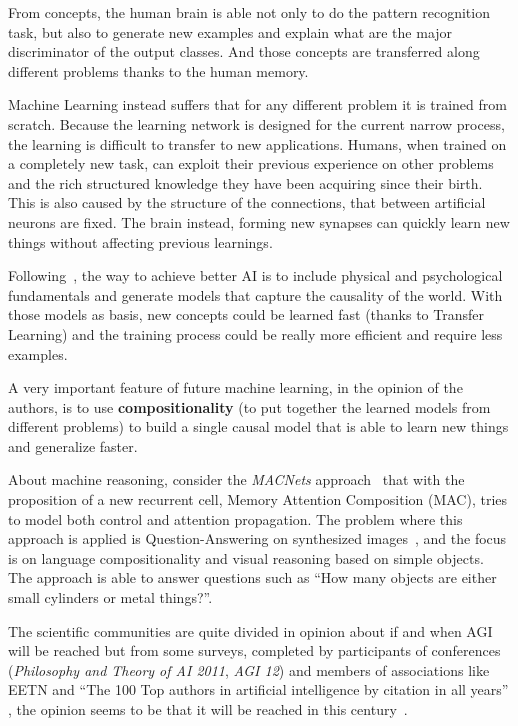 From concepts, the human brain is able not only to do the pattern recognition task, but also to generate new examples and explain what are the major discriminator of the output classes. And those concepts are transferred along different problems thanks to the human memory.

Machine Learning instead suffers that for any different problem it is trained from scratch. Because the learning network is designed for the current narrow process, the learning is difficult to transfer to new applications. Humans, when trained on a completely new task, can exploit their previous experience on other problems and the rich structured knowledge they have been acquiring since their birth. This is also caused by the structure of the connections, that between artificial neurons are fixed. The brain instead, forming new synapses can quickly learn new things without affecting previous learnings.~\cite{hawkins2016neurons}

Following~\cite{pearl2018theoretical}, the way to achieve better AI is to include physical and psychological fundamentals and generate models that capture the causality of the world. With those models as basis, new concepts could be learned fast (thanks to Transfer Learning) and the training process could be really more efficient and require less examples.

A very important feature of future machine learning, in the opinion of the authors, is to use \textbf{compositionality} (to put together the learned models from different problems) to build a single causal model that is able to learn new things and generalize faster.

About machine reasoning, consider the \textit{MACNets} approach~\cite{hudson2018compositional} that with the proposition of a new recurrent cell, Memory Attention Composition (MAC), tries to model both control and attention propagation. The problem where this approach is applied is Question-Answering on synthesized images~\cite{johnson2017clevr}, and the focus is on language compositionality and visual reasoning based on simple objects. The approach is able to answer questions such as ``How many objects are either small cylinders or metal things?''.

The scientific communities are quite divided in opinion about if and when AGI will be reached but from some surveys, completed by participants of conferences (\textit{Philosophy and Theory of AI 2011}, \textit{AGI 12}) and members of associations like EETN and ``The 100 Top authors in artificial intelligence by citation in all years'' , the opinion seems to be that it will be reached in this century~\cite{muller2016future}.

